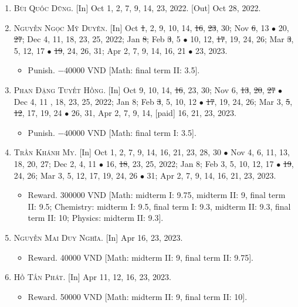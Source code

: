 \documentclass{article}
\begin{document}
\begin{enumerate}
	\item \textsc{Bùi Quốc Dũng.} \textsf{[In]} Oct 1, 2, 7, 9, 14, 23, 2022. \textsf{[Out]} Oct 28, 2022.
	\item \textsc{Nguyễn Ngọc Mỹ Duyên.} \textsf{[In]} Oct \st{1}, 2, 9, 10, 14, \st{16}, \st{23}, 30; Nov \st{6}, 13 $\bullet$ 20, \st{27}; Dec 4, 11, 18, 23, 25, 2022; Jan \st{8}; Feb \st{3}, 5 $\bullet$ 10, 12, \st{17}, 19, 24, 26; Mar \st{3}, 5, 12, 17 $\bullet$ \st{19}, 24, 26, 31; Apr 2, 7, 9, 14, 16, 21 $\bullet$ 23, 2023.
	\begin{itemize}
		\item \textsf{Punish.} $-40000$ VND [Math: final term II: 3.5].
	\end{itemize}
	\item \textsc{Phan Đặng Tuyết Hồng.} \textsf{[In]} Oct 9, 10, 14, \st{16}, 23, 30; Nov 6, \st{13}, \st{20}, \st{27} $\bullet$ Dec 4, 11 , 18, 23, 25, 2022; Jan 8; Feb \st{3}, 5, 10, 12 $\bullet$ \st{17}, 19, 24, 26; Mar 3, \st{5}, \st{12}, 17, 19, 24 $\bullet$ 26, 31, Apr 2, 7, 9, 14, [paid] 16, 21, 23, 2023.
	\begin{itemize}
		\item \textsf{Punish.} $-40000$ VND [Math: final term I: 3.5].
	\end{itemize}
	\item \textsc{Trần Khánh My.} \textsf{[In]} Oct 1, 2, 7, 9, 14, 16, 21, 23, 28, 30 $\bullet$ Nov 4, 6, 11, 13, 18, 20, 27; Dec 2, 4, 11 $\bullet$ 16, \st{18}, 23, 25, 2022; Jan 8; Feb 3, 5, 10, 12, 17 $\bullet$ \st{19}, 24, 26; Mar 3, 5, 12, 17, 19, 24, 26 $\bullet$ 31; Apr 2, 7, 9, 14, 16, 21, 23, 2023.
	\begin{itemize}
		\item \textsf{Reward.} 300000 VND [Math: midterm I: 9.75, midterm II: 9, final term II: 9.5;  Chemistry: midterm I: 9.5, final term I: 9.3, midterm II: 9.3, final term II: 10; Physics: midterm II: 9.3].
	\end{itemize}
	\item \textsc{Nguyễn Mai Duy Nghĩa.} \textsf{[In]} Apr 16, 23, 2023.
	\begin{itemize}
		\item \textsf{Reward.} 40000 VND [Math: midterm II: 9, final term II: 9.75].
	\end{itemize}
	\item \textsc{Hồ Tấn Phát.} \textsf{[In]} Apr 11, 12, 16, 23, 2023.
	\begin{itemize}
		\item \textsf{Reward.} 50000 VND [Math: midterm II: 9, final term II: 10].

\end{itemize}
\end{enumerate}
\end{document}
